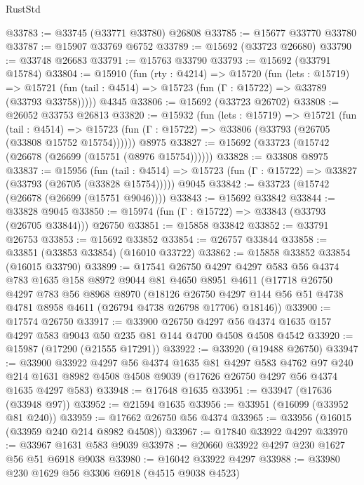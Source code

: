 \begin{lexlean}{RustStd}
\begin{coremodule}
@33783 := @33745 (@33771 @33780) @26808
@33785 := @15677 @33770 @33780
@33787 := @15907 @33769 @6752
@33789 := @15692 (@33723 @26680)
@33790 := @33748 @26683
@33791 := @15763 @33790
@33793 := @15692 (@33791 @15784)
@33804 := @15910
    (fun (rty : @4214) =>
    @15720
      (fun (lets : @15719) =>
      @15721 (fun (tail : @4514) => @15723 (fun (Γ : @15722) => @33789 (@33793 @33758)))))
    @4345
@33806 := @15692 (@33723 @26702)
@33808 := @26052 @33753 @26813
@33820 := @15932
    (fun (lets : @15719) =>
    @15721
      (fun (tail : @4514) =>
      @15723 (fun (Γ : @15722) => @33806 (@33793 (@26705 (@33808 @15752 @15754))))))
    @8975
@33827 := @15692 (@33723 (@15742 (@26678 (@26699 (@15751 (@8976 @15754))))))
@33828 := @33808 @8975
@33837 := @15956
    (fun (tail : @4514) => @15723 (fun (Γ : @15722) => @33827 (@33793 (@26705 (@33828 @15754)))))
    @9045
@33842 := @33723 (@15742 (@26678 (@26699 (@15751 @9046))))
@33843 := @15692 @33842
@33844 := @33828 @9045
@33850 := @15974 (fun (Γ : @15722) => @33843 (@33793 (@26705 @33844))) @26750
@33851 := @15858 @33842
@33852 := @33791 @26753
@33853 := @15692 @33852
@33854 := @26757 @33844
@33858 := @33851 (@33853 @33854) (@16010 @33722)
@33862 := @15858 @33852 @33854 (@16015 @33790)
@33899 := @17541
    @26750
    @4297
    @4297
    @583
    @56
    @4374
    @783
    @1635
    @158
    @8972
    @9044
    @81
    @4650
    @8951
    @4611
    (@17718
      @26750
      @4297
      @783
      @56
      @8968
      @8970
      (@18126
        @26750
        @4297
        @144
        @56
        @51
        @4738
        @4781
        @8958
        @4611
        (@26794 @4738 @26798 @17706)
        @18146))
@33900 := @17574 @26750
@33917 := @33900
    @26750
    @4297
    @56
    @4374
    @1635
    @157
    @4297
    @583
    @9043
    @50
    @235
    @81
    @144
    @4700
    @4508
    @4508
    @4542
@33920 := @15987 (@17290 (@21555 @17291))
@33922 := @33920 (@19488 @26750)
@33947 := @33900
    @33922
    @4297
    @56
    @4374
    @1635
    @81
    @4297
    @583
    @4762
    @97
    @240
    @214
    @1631
    @8982
    @4508
    @4508
    @9039
    (@17626 @26750 @4297 @56 @4374 @1635 @4297 @583)
@33948 := @17648 @1635
@33951 := @33947 (@17636 (@33948 @97))
@33952 := @21594 @1635
@33956 := @33951 (@16099 (@33952 @81 @240))
@33959 := @17662 @26750 @56 @4374
@33965 := @33956 (@16015 (@33959 @240 @214 @8982 @4508))
@33967 := @17840 @33922 @4297
@33970 := @33967 @1631 @583 @9039
@33978 := @20660 @33922 @4297 @230 @1627 @56 @51 @6918 @9038
@33980 := @16042 @33922 @4297
@33988 := @33980 @230 @1629 @56 @3306 @6918 (@4515 @9038 @4523)

\end{coremodule}
\end{lexlean}
